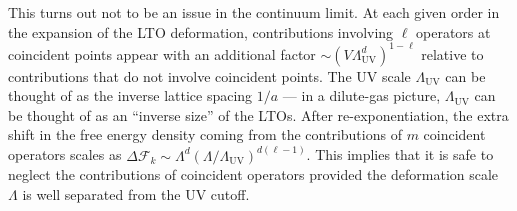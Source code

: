 \documentclass[11pt]{article}
\begin{document}
This turns out not to be an issue in the continuum limit. At each given order in the expansion of the LTO deformation, contributions involving $\ell$ operators at coincident points appear with an additional factor $\sim (V\Lambda_{\text{UV}}^d)^{1-\ell}$ relative to contributions that do not involve coincident points. The UV scale $\Lambda_{\text{UV}}$ can be thought of as the inverse lattice spacing $1/a$ --- in a dilute-gas picture, $\Lambda_{\text{UV}}$ can be thought of as an ``inverse size'' of the LTOs.  After re-exponentiation, the extra shift in the free energy density coming from the contributions of $m$ coincident operators scales as $\Delta \mathcal F_{k} \sim \Lambda^d (\Lambda/\Lambda_{\text{UV}})^{d(\ell-1)}$. This implies that it is safe to neglect the contributions of coincident operators provided the deformation scale $\Lambda$ is well separated from the UV cutoff. 
\end{document}
